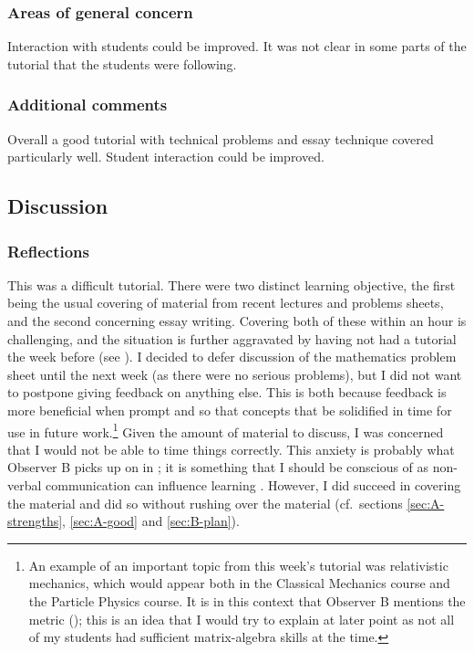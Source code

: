 \subsubsection{Areas of general concern}\label{sec:B-concern}

Interaction with students could be improved. It was not clear in some parts of the tutorial that the students were following.

\subsubsection{Additional comments}

Overall a good tutorial with technical problems and essay technique covered particularly well. Student interaction could be improved.


\subsection{Discussion}\label{sec:me-discuss}

\subsubsection{Reflections}

This was a difficult tutorial. There were two distinct learning objective, the first being the usual covering of material from recent lectures and problems sheets, and the second concerning essay writing. Covering both of these within an hour is challenging, and the situation is further aggravated by having not had a tutorial the week before (see ). I decided to defer discussion of the mathematics problem sheet until the next week (as there were no serious problems), but I did not want to postpone giving feedback on anything else. This is both because feedback is more beneficial when prompt \citep[chapter 4]{Gibbs2015,Jaques2007} and so that concepts that be solidified in time for use in future work.\footnote{An example of an important topic from this week's tutorial was relativistic mechanics, which would appear both in the Classical Mechanics course and the Particle Physics course. It is in this context that Observer B mentions the metric (); this is an idea that I would try to explain at later point as not all of my students had sufficient matrix-algebra skills at the time.} Given the amount of material to discuss, I was concerned that I would not be able to time things correctly. This anxiety is probably what Observer B picks up on in ; it is something that I should be conscious of as non-verbal communication can influence learning \citep[chapter 2]{Brown1988}. However, I did succeed in covering the material and did so without rushing over the material (cf.\ sections \ref{sec:A-strengths}, \ref{sec:A-good} and \ref{sec:B-plan}).

